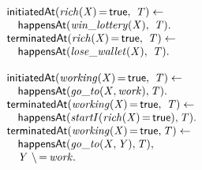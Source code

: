 \documentclass[8pt]{beamer}
\DeclareMathOperator{\val}{=}  %
\def \patsize {}
\def\happensAt{\textsf{\patsize happensAt}}
\def\initiatedAt{\textsf{\patsize initiatedAt}}
\def\terminatedAt{\textsf{\patsize terminatedAt}}
\def\true{\textsf{\patsize true}}
\newenvironment{mysplit}%
  {\arraycolsep 0pt \begin{array}{l}}%
  {\end{array}}
\begin{document}
\begin{frame}
\begin{minipage}{0.48\linewidth}
        \begin{align*}
            \begin{mysplit}
                \initiatedAt\mathit{(rich(X)\val\true,\ T) \leftarrow}\\
                \quad    \happensAt\mathit{(win\_lottery(X),\ T).}\\
                \terminatedAt\mathit{(rich(X)\val\true,\ T) \leftarrow}\\
                \quad    \happensAt\mathit{(lose\_wallet(X),\ T)}.\\\\
                \initiatedAt\mathit{(working(X)\val\true,\ T)\leftarrow}\\
                \quad    \happensAt\mathit{(go\_to(X,work),T)}.\\
                \terminatedAt\mathit{(working(X)\val\true,\ T) \leftarrow}\\
                \quad    \happensAt\mathit{(startI(rich(X)\val\true),T)}.\\
                \terminatedAt\mathit{(working(X)\val\true,T)\leftarrow}\\
                \quad    \happensAt\mathit{(go\_to(X,Y),T)},\\
                \quad	 \mathit{Y\ \backslash\val work}.\\
            \end{mysplit}
        \end{align*}
    \end{minipage}

\end{frame}
\end{document}
